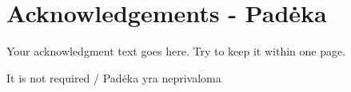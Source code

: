 
\chapter*{Acknowledgements - Padėka}
\label{cha:acknowledgements}



Your acknowledgment text goes here. Try to keep it within one page.

It is not required / Padėka yra neprivaloma

